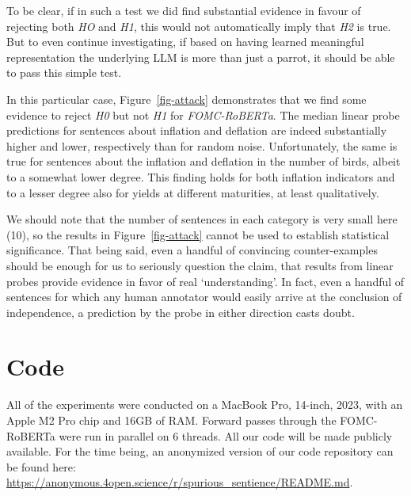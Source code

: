 To be clear, if in such a test we did find substantial evidence in favour of rejecting both \emph{HO} and \emph{H1}, this would not automatically imply that \emph{H2} is true. But to even continue investigating, if based on having learned meaningful representation the underlying LLM is more than just a parrot, it should be able to pass this simple test.

In this particular case, Figure~\ref{fig-attack} demonstrates that we find some evidence to reject \emph{H0} but not \emph{H1} for \emph{FOMC-RoBERTa}. The median linear probe predictions for sentences about inflation and deflation are indeed substantially higher and lower, respectively than for random noise. Unfortunately, the same is true for sentences about the inflation and deflation in the number of birds, albeit to a somewhat lower degree. This finding holds for both inflation indicators and to a lesser degree also for yields at different maturities, at least qualitatively.

We should note that the number of sentences in each category is very small here (10), so the results in Figure~\ref{fig-attack} cannot be used to establish statistical significance. That being said, even a handful of convincing counter-examples should be enough for us to seriously question the claim, that results from linear probes provide evidence in favor of real `understanding'. In fact, even a handful of sentences for which any human annotator would easily arrive at the conclusion of independence, a prediction by the probe in either direction casts doubt.

\section{Code}

All of the experiments were conducted on a MacBook Pro, 14-inch, 2023, with an Apple M2 Pro chip and 16GB of RAM. Forward passes through the FOMC-RoBERTa were run in parallel on 6 threads. All our code will be made publicly available. For the time being, an anonymized version of our code repository can be found here: \url{https://anonymous.4open.science/r/spurious_sentience/README.md}.